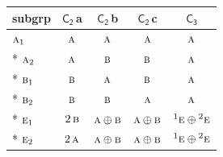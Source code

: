 \documentclass[10pt,a4paper]{article}
\numberwithin{equation}{section}
\newcommand{\grp}[1]{\mathsf{#1}}
\newcommand{\irr}[1]{\text{\normalfont\scshape #1}}
\newcommand{\conjpair}[1]{{}^{#1}}
\newcommand{\clsletter}[1]{\,{\scriptsize\color{black!55}#1}}
\begin{document}
{\small\begin{longtable}{@{}lcccc@{}}\toprule
subgrp & \href{C2.pdf}{$\grp{C_{2}}$}\clsletter{a} & \href{C2.pdf}{$\grp{C_{2}}$}\clsletter{b} & \href{C2.pdf}{$\grp{C_{2}}$}\clsletter{c} & \href{C3.pdf}{$\grp{C_{3}}$}\\\midrule\endhead
\bottomrule\endfoot\endlastfoot
$\irr{a}_{1}$ & $\irr{a}$ & $\irr{a}$ & $\irr{a}$ & $\irr{a}$\\*
$\irr{a}_{2}$ & $\irr{a}$ & $\irr{b}$ & $\irr{b}$ & $\irr{a}$\\*
$\irr{b}_{1}$ & $\irr{b}$ & $\irr{a}$ & $\irr{b}$ & $\irr{a}$\\*
$\irr{b}_{2}$ & $\irr{b}$ & $\irr{b}$ & $\irr{a}$ & $\irr{a}$\\*
$\irr{e}_{1}$ & $2\,\irr{b}$ & $\irr{a}\oplus \irr{b}$ & $\irr{a}\oplus \irr{b}$ & $\conjpair{1}\irr{e}\oplus \conjpair{2}\irr{e}$\\*
$\irr{e}_{2}$ & $2\,\irr{a}$ & $\irr{a}\oplus \irr{b}$ & $\irr{a}\oplus \irr{b}$ & $\conjpair{1}\irr{e}\oplus \conjpair{2}\irr{e}$\\
\bottomrule\end{longtable}}
\end{document}
